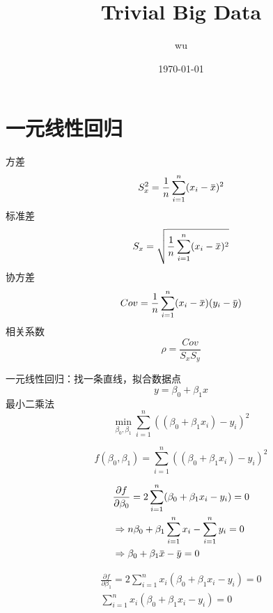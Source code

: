 \documentclass[11pt]{article}
\author{wu}
\date{\today}
\title{Trivial Big Data}
\begin{document}
\maketitle
\tableofcontents


\section{一元线性回归}
\label{sec:orge77907f}
方差
\begin{equation*}
S^2_x=\frac{1}{n}\sum_{i=1}^n(x_i-\barx)^2
\end{equation*}
标准差
\begin{equation*}
S_x=\sqrt{\frac{1}{n}\sum_{i=1}^n(x_i-\barx)^2}
\end{equation*}
协方差
\begin{equation*}
Cov=\frac{1}{n}\sum_{i=1}^n(x_i-\barx)(y_i-\bary)
\end{equation*}
相关系数
\begin{equation*}
\rho=\frac{Cov}{S_xS_y}
\end{equation*}

一元线性回归：找一条直线，拟合数据点
\begin{equation*}
y=\beta_0+\beta_1x
\end{equation*}
最小二乘法
\begin{equation*}
\min_{\beta_0,\beta_1}\sum_{i=1}^n((\beta_0+\beta_1x_i)-y_i)^2
\end{equation*}

\begin{equation*}
f(\beta_0,\beta_1)=\sum_{i=1}^n((\beta_0+\beta_1x_i)-y_i)^2
\end{equation*}

\begin{align*}
&\frac{\partial f}{\partial\beta_0}=2\sum_{i=1}^n(\beta_0+\beta_1x_i-y_i)=0\\
&\Rightarrow n\beta_0+\beta_1\sum_{i=1}^nx_i-\sum_{i=1}^ny_i=0\\
&\Rightarrow\beta_0+\beta_1\barx-\bary=0
\end{align*}

\begin{gather*}
\frac{\partial f}{\partial\beta_1}=2\sum_{i=1}^nx_i(\beta_0+\beta_1x_i-y_i)=0\\
\sum_{i=1}^nx_i(\beta_0+\beta_1x_i-y_i)=0
\end{gather*}
\end{document}
